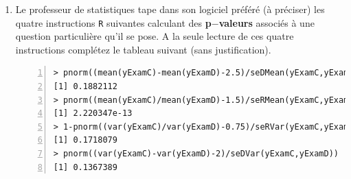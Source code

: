 \documentclass[10pt]{report}
\begin{document}
\begin{exercice}
\begin{enumerate}
\begin{Correction}
\noindent \textbf{Préliminaire} : puisque $\mathtt{(var(yExamC)-var(yExamD)-0)}\simeq0.3787755$ est du même signe (i.e. positif) que $\mathtt{deltaEst.H0}$ , on a~: 
      \begin{itemize}
\item \textit{paramètre d'intérêt}~: $d_{\sigma^2}=\sigma^2_{EC}-\sigma^2_{ED}$
\item \textit{sa future estimation}~: $\Est{d_{\sigma^2}}{Y^{EC},Y^{ED}}=\Est{\sigma^2_{EC}}{Y^{EC}}-\Est{\sigma^2_{ED}}{Y^{ED}}$
\end{itemize}
\noindent \textbf{Hypothèses de test} : $\mathbf{H}_0:$ $d_{\sigma^2}=0$ vs {\large $\mathbf{H}_1:$ $d_{\sigma^2}\neq0$}\\
\textbf{Statistique de test sous $\mathbf{H}_0$} :
  $$
  \Est{\delta_{d_{\sigma^2},0}}{Y^{EC},Y^{ED}}= {\displaystyle \frac{\Est{d_{\sigma^2}}{Y^{EC},Y^{ED}}-0}{
\Est{\sigma_{\cqlshat{d_{\sigma^2}}}}{Y^{EC},Y^{ED}}
}} 
  \SuitApprox \mathcal{N}(0,1)
  $$
\textbf{Règle de décision} : Accepter $\mathbf{H}_1$ si 
  [$\Est{\delta_{d_{\sigma^2},0}}{y^{EC},y^{ED}} < \delta^-_{lim,\frac{5\%}{2}}$ ou $\Est{\delta_{d_{\sigma^2},0}}{y^{EC},y^{ED}} > \delta^+_{lim,\frac{5\%}{2}}$
    \\
\noindent \textbf{Conclusion} :
puisqu'au vu des données, 
  \begin{eqnarray*}
\Est{\delta_{d_{\sigma^2},0}}{y^{EC},y^{ED}} &\NotR&\mathtt{(var(yExamC)-var(yExamD)-0)/seDVar(yExamC,yExamD)}\simeq 0.2558515\\&\ngtr & \delta^+_{lim,\frac{5\%}{2}} \NotR \mathtt{qnorm(1-.05/2)}\simeq1.959964
\end{eqnarray*}
  
on ne peut pas plutôt penser (avec un risque de 5\%) que les niveaux des étudiants en section~C et~D sont hétérogènes.
\end{Correction}


\item Le professeur de statistiques tape dans son logiciel préféré (à préciser) les quatre instructions \texttt{R} suivantes calculant des \textbf{p$-$valeurs} associ{\'e}s {\`a} une question particuli{\`e}re qu'il se pose. A la seule lecture de ces quatre instructions compl{\'e}tez le tableau suivant (sans justification). 


\begin{Verbatim}[frame=leftline,fontfamily=tt,fontshape=n,numbers=left]
> pnorm((mean(yExamC)-mean(yExamD)-2.5)/seDMean(yExamC,yExamD))      ## test 1
[1] 0.1882112
> pnorm((mean(yExamC)/mean(yExamD)-1.5)/seRMean(yExamC,yExamD))      ## test 2
[1] 2.220347e-13
> 1-pnorm((var(yExamC)/var(yExamD)-0.75)/seRVar(yExamC,yExamD))      ## test 3
[1] 0.1718079
> pnorm((var(yExamC)-var(yExamD)-2)/seDVar(yExamC,yExamD))           ## test 4
[1] 0.1367389
\end{Verbatim}



\end{enumerate}
\end{exercice}
\end{document}
